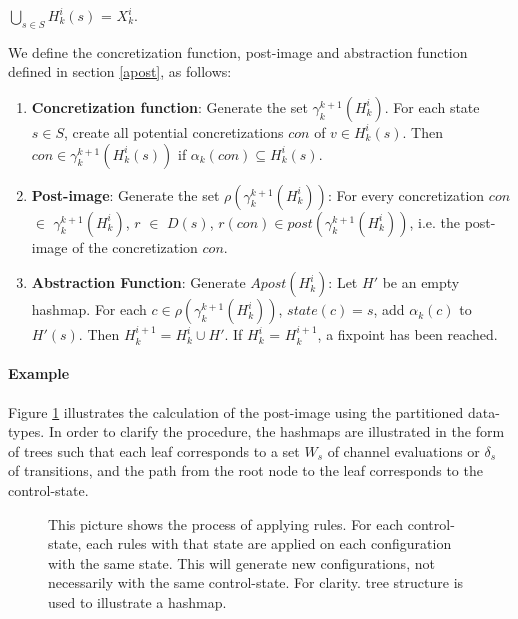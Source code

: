 $\bigcup\limits_{s \in S} H_k^i(s)$ = $X_k^i$.

We define the concretization function, post-image and abstraction function defined in section \ref{apost}, as follows:

\begin{enumerate}
\item
\textbf{Concretization function}:
Generate the set $\gamma_k^{k+1}(H_k^i)$. For each state $s \in S$, create all potential concretizations $con$ of $v \in H_k^i(s)$. Then $con \in \gamma_k^{k+1}(H_k^i(s))$ if $\alpha_k(con) \subseteq H_k^i(s)$.

\item
\textbf{Post-image}:
Generate the set $\rho(\gamma_k^{k+1}(H_k^i))$: For every concretization $con$ $\in$ $\gamma_k^{k+1}(H_k^i)$, $r$ $\in$ $D(s)$, $r(con) \in post(\gamma_k^{k+1}(H_k^i))$, i.e. the post-image of the concretization $con$.

\item
\textbf{Abstraction Function}:
Generate $Apost(H_k^i)$: Let $H'$ be an empty hashmap. For each $c \in \rho(\gamma_k^{k+1}(H_k^i))$, $state(c) = s$,  add $\alpha_k(c)$ to $H'(s)$. Then $H_k^{i+1} = H_k^i \cup H'$. If $H_k^i$ = $H_k^{i+1}$, a fixpoint has been reached.
\end{enumerate}

\paragraph{Example}

Figure \ref{applyrule} illustrates the calculation of the post-image using the partitioned data-types. In order to clarify the procedure, the hashmaps are illustrated in the form of trees such that each leaf corresponds to a set $W_s$ of channel evaluations or $\delta_s$ of transitions, and the path from the root node to the leaf corresponds to the control-state.



\begin{figure}
\centering
\def\svgwidth{\columnwidth}

\caption{This picture shows the process of applying rules. For each control-state, each rules with that state are applied on each configuration with the same state. This will generate new configurations, not necessarily with the same control-state. For clarity.  tree structure is used to illustrate a hashmap.}
\label{applyrule}
\end{figure}



